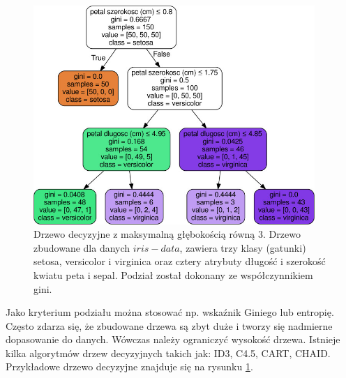\begin{figure}[H]
	\centering
	\includegraphics[width=0.95\textwidth]{./images/drzewo.jpg}
	\caption{Drzewo decyzyjne z maksymalną głębokością równą 3. Drzewo zbudowane dla danych $iris-data$, zawiera trzy klasy (gatunki) setosa, versicolor i virginica oraz cztery atrybuty długość i szerokość kwiatu peta i sepal. Podział został dokonany ze współczynnikiem gini.}
	\label{fig:drzewodec}
\end{figure}
Jako kryterium podziału można stosować np. wskaźnik Giniego lub entropię. Często zdarza się, że zbudowane drzewa są zbyt duże i tworzy się nadmierne dopasowanie do danych. Wówczas należy ograniczyć wysokość drzewa.
Istnieje kilka algorytmów drzew decyzyjnych takich jak: ID3, C4.5, CART, CHAID. Przykładowe drzewo decyzyjne znajduje się na rysunku \ref{fig:drzewodec}.
